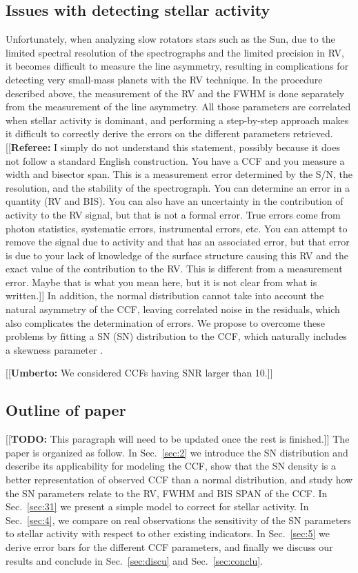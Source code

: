 \documentclass[11pt, oneside]{article}
\newcommand{\umberto}[1]{{\color{green}[[\textbf{Umberto: }#1]]}}
\newcommand{\comment}[1]{{\color{red}[[\textbf{Referee: }#1]]}}
\newcommand{\todo}[1]{{\color{cyan}[[\textbf{TODO: }#1]]}}
\begin{document}
\subsection{Issues with detecting stellar activity}
Unfortunately, when analyzing slow rotators stars such as the Sun, due to the limited spectral resolution of the spectrographs and the limited precision in RV, it becomes difficult to measure the line asymmetry, resulting in complications for detecting very small-mass planets with the RV technique.
In the procedure described above, the measurement of the RV and the FWHM is done separately from the measurement of the line asymmetry. All those parameters are correlated when stellar activity is dominant, and performing a step-by-step approach makes it difficult to correctly derive the errors on the different parameters retrieved. 
\comment{I simply do not understand this statement, possibly because it does not follow a standard English construction. You have a CCF and you measure a width and bisector span. This is a measurement error determined by the S/N, the resolution, and the stability of the spectrograph. You can determine an error in a quantity (RV and BIS). You can also have an uncertainty in the contribution of activity to the RV signal, but that is not a formal error. True errors come from photon statistics, systematic errors, instrumental errors, etc. You can attempt to remove the signal due to activity and that has an associated error, but that error is due to your lack of knowledge of the surface structure causing this RV and the exact value of the contribution to the RV. This is different from a measurement error. Maybe that is what you mean here, but it is not clear from what is written.}
In addition, the normal distribution cannot take into account the natural asymmetry of the CCF, leaving correlated noise in the residuals, which also complicates the determination of errors. We propose to overcome these problems by fitting a SN (SN) distribution to the CCF, which naturally includes a skewness parameter \citep[][]{Azzalini1985}.

\umberto{We considered CCFs having SNR larger than 10.}


\subsection{Outline of paper}
\todo{This paragraph will need to be updated once the rest is finished.} The paper is organized as follow. In Sec.~\ref{sec:2} we introduce the SN distribution and describe its applicability for modeling the CCF,  show that the SN density is a better representation of observed CCF than a normal distribution, and study how the SN parameters relate to the RV, FWHM and BIS SPAN of the CCF. In Sec.~\ref{sec:31} we present a simple model to correct for stellar activity. In Sec.~\ref{sec:4}, we compare on real observations the sensitivity of the SN parameters to stellar activity with respect to other existing indicators. In Sec.~\ref{sec:5} we derive error bars for the different CCF parameters, and finally we discuss our results and conclude in Sec.~\ref{sec:discu} and Sec.~\ref{sec:conclu}.
\end{document}
